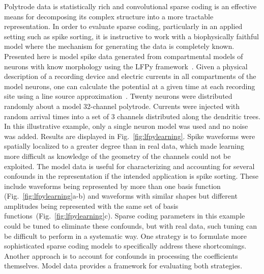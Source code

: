 Polytrode data is statistically rich and convolutional sparse coding
is an effective means for decomposing its complex structure into a
more tractable representation. In order to evaluate sparse coding,
particularly in an applied setting such as spike sorting, it is
instructive to work with a biophysically faithful model where the
mechanism for generating the data is completely known. Presented here
is model spike data generated from compartmental models of neurons
with know morphology using the LFPy framework~\cite{linden2011}. Given
a physical description of a recording device and electric currents in
all compartments of the model neurons, one can calculate the potential
at a given time at each recording site using a line source
approximation~\cite{Holt:fk}. Twenty neurons were distributed randomly
about a model 32-channel polytrode. Currents were injected with random
arrival times into a set of 3 channels distributed along the dendritic
trees. In this illustrative example, only a single neuron model was
used and no noise was added. Results are displayed in
Fig.~\ref{fig:lfpylearning}. Spike waveforms were spatially localized
to a greater degree than in real data, which made learning more
difficult as knowledge of the geometry of the channels could not be
exploited. The model data is useful for characterizing and accounting
for several confounds in the representation if the intended
application is spike sorting. These include waveforms being
represented by more than one basis function
(Fig.~\ref{fig:lfpylearning}a-b) and waveforms with similar shapes but
different amplitudes being represented with the same set of basis
functions~(Fig.~\ref{fig:lfpylearning}c). Sparse coding parameters in
this example could be tuned to eliminate these confounds, but with
real data, such tuning can be difficult to perform in a systematic
way. One strategy is to formulate more sophisticated sparse coding
models to specifically address these shortcomings. Another approach is
to account for confounds in processing the coefficients
themselves. Model data provides a framework for evaluating both
strategies.

